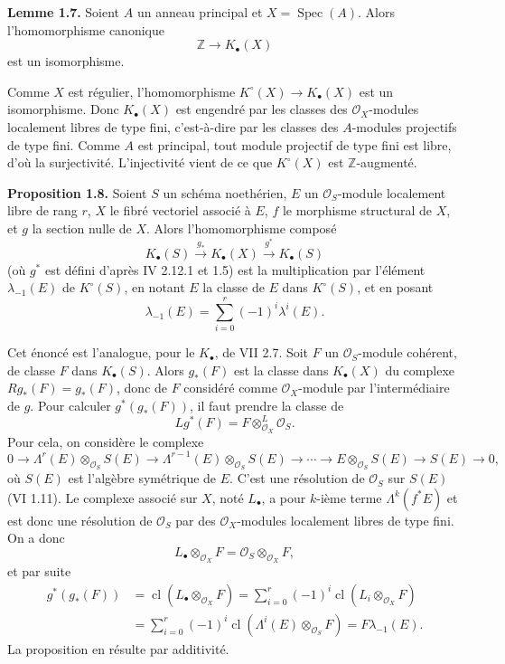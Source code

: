 \documentclass[11pt]{article}
\newcommand{\cl}{\operatorname{cl}}
\newcommand{\Spec}{\operatorname{Spec}}
\begin{document}
\textbf{Lemme 1.7.} Soient $A$ un anneau principal et $X=\Spec(A)$. Alors l'homomorphisme canonique
\[
\mathbb Z\longrightarrow K_\bullet(X)
\]
est un isomorphisme.

Comme $X$ est régulier, l'homomorphisme $K^\circ(X)\to K_\bullet(X)$ est un isomorphisme. Donc $K_\bullet(X)$ est engendré par les classes des $\mathcal O_X$-modules localement libres de type fini, c'est-à-dire par les classes des $A$-modules projectifs de type fini. Comme $A$ est principal, tout module projectif de type fini est libre, d'où la surjectivité. L'injectivité vient de ce que $K^\circ(X)$ est $\mathbb Z$-augmenté.

\textbf{Proposition 1.8.} Soient $S$ un schéma noethérien, $E$ un $\mathcal O_S$-module localement libre de rang $r$, $X$ le fibré vectoriel associé à $E$, $f$ le morphisme structural de $X$, et $g$ la section nulle de $X$. Alors l'homomorphisme composé
\[
K_\bullet(S)\xrightarrow{g_*}K_\bullet(X)\xrightarrow{g^*}K_\bullet(S)
\]
(où $g^*$ est défini d'après IV 2.12.1 et 1.5) est la multiplication par l'élément $\lambda_{-1}(E)$ de $K^\circ(S)$, en notant $E$ la classe de $E$ dans $K^\circ(S)$, et en posant
\[
\lambda_{-1}(E)=\sum_{i=0}^r(-1)^i\lambda^i(E).
\]

Cet énoncé est l'analogue, pour le $K_\bullet$, de VII 2.7. Soit $F$ un $\mathcal O_S$-module cohérent, de classe $F$ dans $K_\bullet(S)$. Alors $g_*(F)$ est la classe dans $K_\bullet(X)$ du complexe $Rg_*(F)=g_*(F)$, donc de $F$ considéré comme $\mathcal O_X$-module par l'intermédiaire de $g$. Pour calculer $g^*(g_*(F))$, il faut prendre la classe de
\[
Lg^*(F)=F\otimes^L_{\mathcal O_X}\mathcal O_S.
\]
Pour cela, on considère le complexe
\[
0\longrightarrow \Lambda^r(E)\otimes_{\mathcal O_S}S(E)\longrightarrow
\Lambda^{r-1}(E)\otimes_{\mathcal O_S}S(E)\longrightarrow\cdots\longrightarrow
E\otimes_{\mathcal O_S}S(E)\longrightarrow S(E)\longrightarrow 0,
\]
où $S(E)$ est l'algèbre symétrique de $E$. C'est une résolution de $\mathcal O_S$ sur $S(E)$ (VI 1.11). Le complexe associé sur $X$, noté $L_\bullet$, a pour $k$-ième terme $\Lambda^k(f^*E)$ et est donc une résolution de $\mathcal O_S$ par des $\mathcal O_X$-modules localement libres de type fini. On a donc
\[
L_\bullet\otimes_{\mathcal O_X}F=\mathcal O_S\otimes_{\mathcal O_X}F,
\]
et par suite
\[
\begin{aligned}
g^*(g_*(F))
&=\cl(L_\bullet\otimes_{\mathcal O_X}F)
=\sum_{i=0}^r(-1)^i\cl(L_i\otimes_{\mathcal O_X}F)\\
&=\sum_{i=0}^r(-1)^i\cl(\Lambda^i(E)\otimes_{\mathcal O_S}F)
=F\lambda_{-1}(E).
\end{aligned}
\]
La proposition en résulte par additivité.
\end{document}
